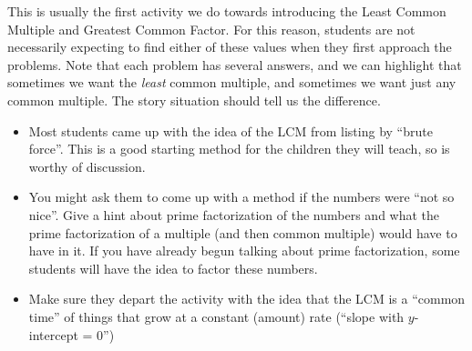 \documentclass{ximera}
\begin{document}
\newpage
\begin{instructorNotes}
This is usually the first activity we do towards introducing the Least Common Multiple and Greatest Common Factor.  For this reason, students are not necessarily expecting to find either of these values when they first approach the problems.  Note that each problem has several answers, and we can highlight that sometimes we want the {\em least} common multiple, and sometimes we want just any common multiple.  The story situation should tell us the difference.

\begin{itemize}
	\item Most students came up with the idea of the LCM from listing by ``brute force''. This is a good starting method for the children they will teach, so is worthy of discussion.
	\item You might ask them to come up with a method if the numbers were ``not so nice''.  Give a hint about prime factorization of the numbers and what the prime factorization of a multiple (and then common multiple) would have to have in it.  If you have already begun talking about prime factorization, some students will have the idea to factor these numbers.
	\item Make sure they depart the activity with the idea that the LCM is a ``common time'' of things that grow at a constant (amount) rate (``slope with $y$-intercept = 0'')
\end{itemize}
\end{instructorNotes}
\end{document}

